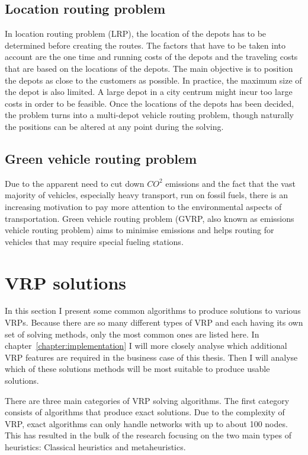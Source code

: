 \subsection{Location routing problem}

In location routing problem (LRP), the location of the depots has to be determined before creating the routes. The factors that have to be taken into account are the one time and running costs of the depots and the traveling costs that are based on the locations of the depots. The main objective is to position the depots as close to the customers as possible. In practice, the maximum size of the depot is also limited. A large depot in a city centrum might incur too large costs in order to be feasible. Once the locations of the depots has been decided, the problem turns into a multi-depot vehicle routing problem, though naturally the positions can be altered at any point during the solving. \cite{tuzun1999two}


\subsection{Green vehicle routing problem}

Due to the apparent need to cut down $CO^2$ emissions and the fact that the vast majority of vehicles, especially heavy transport, run on fossil fuels, there is an increasing motivation to pay more attention to the environmental aspects of transportation. Green vehicle routing problem (GVRP, also known as emissions vehicle routing problem) aims to minimise emissions and helps routing for vehicles that may require special fueling stations. \cite{erdougan2012green}



\section{VRP solutions}

In this section I present some common algorithms to produce solutions to various VRPs. Because there are so many different types of VRP and each having its own set of solving methods, only the most common ones are listed here. In chapter~\ref{chapter:implementation} I will more closely analyse which additional VRP features are required in the business case of this thesis. Then I will analyse which of these solutions methods will be most suitable to produce usable solutions.

There are three main categories of VRP solving algorithms. The first category consists of algorithms that produce exact solutions. Due to the complexity of VRP, exact algorithms can only handle networks with up to about 100 nodes. This has resulted in the bulk of the research focusing on the two main types of heuristics: Classical heuristics and metaheuristics. \cite{laporte2007you}  

